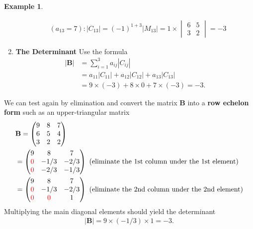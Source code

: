 \documentclass[10pt,a4paper]{book}
\newcommand{\red}[1]{\textcolor{red}{#1}}
\theoremstyle{definition}\newtheorem{definition}{Definition}
\theoremstyle{definition}\newtheorem{fact}{Fact}
\theoremstyle{definition}\newtheorem{ex}{Ex.}
\theoremstyle{definition}\newtheorem{project}{Project}
\theoremstyle{definition}\newtheorem{problem}{Problem}
\theoremstyle{definition}\newtheorem{example}{Example}
\numberwithin{theorem}{chapter}
\numberwithin{corollary}{chapter}
\numberwithin{assumption}{chapter}
\numberwithin{definition}{chapter}
\numberwithin{prop}{chapter}
\numberwithin{notation}{chapter}
\numberwithin{problem}{chapter}
\numberwithin{example}{chapter}
\numberwithin{fact}{chapter}
\numberwithin{ex}{chapter}
\def\B{\mathbf B}
\begin{document}
\begin{example}
\begin{enumerate}
\begin{align*}
				&(a_{13 } = 7) : |C_{13}| = (-1)^{1+3} |M_{13}| = 1\times \begin{vmatrix}
					6 & 5 \\ 3 & 2
				\end{vmatrix} = - 3
			\end{align*}
			\item \textbf{The Determinant} Use the formula
			\begin{align*}
				|\B| &= \sum^3_{i=1} a_{ij} |C_{ij}| \\
				&= a_{11} |C_{11}| + a_{12} |C_{12}| + a_{13} |C_{13}| \\
				&= 9 \times (-3) + 8\times 0 + 7 \times (-3) = -3.
			\end{align*}
		\end{enumerate}
		
		We can test again by elimination and convert the matrix $\B$ into a \textbf{row echelon form} such as an upper-triangular matrix
		\begin{align*}
			&\B = \begin{pmatrix}
				9 & 8 & 7 \\
				6 & 5 & 4 \\
				3 & 2 & 2
			\end{pmatrix} \\
			&= \begin{pmatrix}
				9 & 8 & 7 \\
				\red{0} & -1/3 & -2/3 \\
				\red{0} & -2/3 & -1/3
			\end{pmatrix} \ \text{(eliminate the 1st column under the 1st element)} \\
			&= \begin{pmatrix}
				9 & 8 & 7 \\
				\red{0} & -1/3 & -2/3 \\
				\red{0} & \red{0} & 1
			\end{pmatrix} \ \text{(eliminate the 2nd column under the 2nd element)}
		\end{align*}
		Multiplying the main diagonal elements should yield the determinant
		\begin{align*}
			|\B| = 9 \times (-1/3) \times 1 = -3.
		\end{align*}
	\end{example}
	
\end{document}
